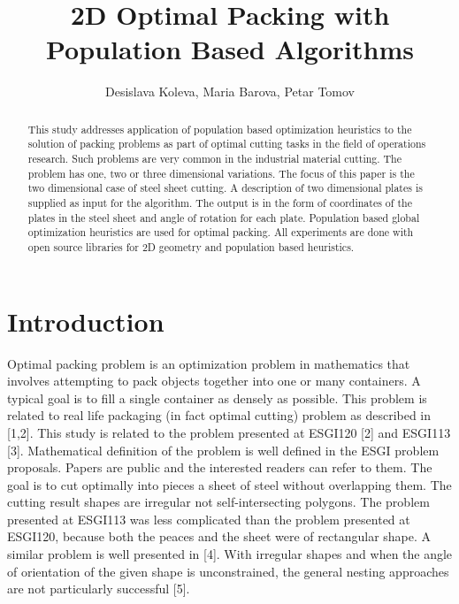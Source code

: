 \documentclass{llncs}
\begin{document}
\pagestyle{headings} 
\mainmatter
%
\title{2D Optimal Packing with Population Based Algorithms}
%
\author{Desislava Koleva, Maria Barova, Petar Tomov}
%
%
%
%
%
\maketitle
%
\begin{abstract}
This study addresses application of population based optimization heuristics to the solution of packing problems as part of optimal cutting tasks in the field of operations research. Such problems are very common in the industrial material cutting. The problem has one, two or three dimensional variations. The focus of this paper is the two dimensional case of steel sheet cutting. A description of two dimensional plates is supplied as input for the algorithm. The output is in the form of coordinates of the plates in the steel sheet and angle of rotation for each plate. Population based global optimization heuristics are used for optimal packing. All experiments are done with open source libraries for 2D geometry and population based heuristics. 
\end{abstract}
%
\section{Introduction}
%
Optimal packing problem is an optimization problem in mathematics that involves attempting to pack objects together into one or many containers. A typical goal is to fill a single container as densely as possible. This problem is related to real life packaging (in fact optimal cutting) problem as described in [1,2]. This study is related to the problem presented at ESGI120 [2] and ESGI113 [3]. Mathematical definition of the problem is well defined in the ESGI problem proposals. Papers are public and the interested readers can refer to them. The goal is to cut optimally into pieces a sheet of steel without overlapping them. The cutting result shapes are irregular not self-intersecting polygons. The problem presented at ESGI113 was less complicated than the problem presented at ESGI120, because both the peaces and the sheet were of rectangular shape. A similar problem is well presented in [4]. With irregular shapes and when the angle of orientation of the given shape is unconstrained, the general nesting approaches are not particularly successful [5]. 
\end{document}
